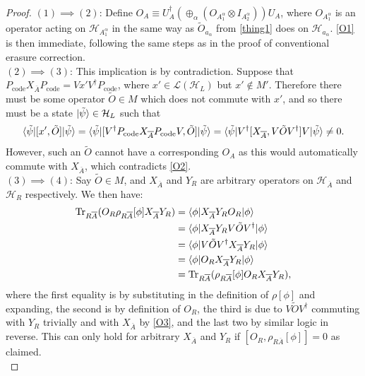 \documentclass[12pt,a4paper]{report}
\numberwithin{equation}{section}
\newcommand{\Pc}{P_{\text{code}}}
\newcommand{\ol}[1]{\overline{#1}}
\newcommand{\tr}{\text{Tr}}
\theoremstyle{definition}
\theoremstyle{theorem}
\theoremstyle{theorem}
\theoremstyle{example}
\theoremstyle{definition}
\begin{document}
\begin{proof}
	$(1)\implies (2)$: Define $O_{A}\equiv U_{A}^{\dagger}(\oplus_{\alpha}(O_{A_{1}^{\alpha}}\otimes I_{A_{2}^{\alpha}}))U_{A}$, where $O_{A_{1}^{\alpha}}$ is an operator acting on $\mathcal{H}_{A_{1}^{\alpha}}$ in the same way as $\tilde{O}_{a_{\alpha}}$ from \ref{thing1} does on $\mathcal{H}_{a_{\alpha}}$. \ref{O1} is then immediate, following the same steps as in the proof of conventional erasure correction.\\
	$(2)\implies (3)$: This implication is by contradiction. Suppose that $\Pc X_{\ol{A}}\Pc=Vx'V^{\dagger}\Pc$, where $x'\in\mathcal{L}(\mathcal{H}_{L})$ but $x'\notin M'$. Therefore there must be some operator $\tilde{O}\in M$ which does not commute with $x'$, and so there must be a state $\ket{\tilde{\psi}}\in\mathcal{H}_{L}$ such that
	\begin{equation}
		\braket{\tilde{\psi}|[x',\tilde{O}]|\tilde{\psi}}=\braket{\tilde{\psi}|[V^{\dagger}\Pc X_{\ol{A}}\Pc V,\tilde{O}]|\tilde{\psi}}=\braket{\tilde{\psi}|V^{\dagger}[X_{\ol{A}},V\tilde{O}V^{\dagger}]V|\tilde{\psi}}\neq 0.
	\end{equation}
	However, such an $\tilde{O}$ cannot have a corresponding $O_{A}$ as this would automatically commute with $X_{\ol{A}}$, which contradicts \ref{O2}.\\
	$(3)\implies (4)$: Say $\tilde{O}\in M$, and $X_{\ol{A}}$ and $Y_{R}$ are arbitrary operators on $\mathcal{H}_{\ol{A}}$ and $\mathcal{H}_{R}$ respectively. We then have:
	\begin{equation}
		\begin{aligned}
			\tr_{R\ol{A}}(O_{R}\rho_{R\ol{A}}[\phi]X_{\ol{A}}Y_{R})&=\braket{\phi|X_{\ol{A}}Y_{R}O_{R}|\phi}\\&=\braket{\phi|X_{\ol{A}}Y_{R}V\tilde{O}V^{\dagger}|\phi}\\&=\braket{\phi|V\tilde{O}V^{\dagger}X_{\ol{A}}Y_{R}|\phi}\\&=\braket{\phi|O_{R}X_{\ol{A}}Y_{R}|\phi}\\&=\tr_{R\ol{A}}(\rho_{R\ol{A}}[\phi]O_{R}X_{\ol{A}}Y_{R}),
		\end{aligned}
	\end{equation}
	where the first equality is by substituting in the definition of $\rho[\phi]$ and expanding, the second is by definition of $O_{R}$, the third is due to $V\tilde{O}V^{\dagger}$ commuting with $Y_{R}$ trivially and with $X_{\ol{A}}$ by \ref{O3}, and the last two by similar logic in reverse. This can only hold for arbitrary $X_{\ol{A}}$ and $Y_{R}$ if $[O_{R},\rho_{R\ol{A}}[\phi]]=0$ as claimed.\\

\end{proof}
\end{document}

